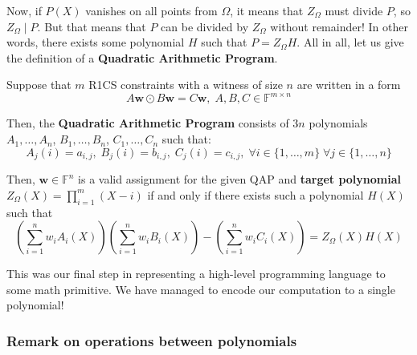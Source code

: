 \documentclass[../lecture-notes.tex]{subfiles}
\begin{document}
Now, if $P(X)$ vanishes on all points from $\Omega$, it means that $Z_{\Omega}$ must divide $P$, so $Z_{\Omega} \mid P$. But that means
that $P$ can be divided by $Z_{\Omega}$ without remainder! In other words, there exists some polynomial $H$ such that $P=Z_{\Omega}H$. All in all,
let us give the definition of a \textbf{Quadratic Arithmetic Program}.

\begin{definition}
    Suppose that $m$ R1CS constraints with a witness of size $n$ are written in a form
    \begin{equation*}
        A\mathbf{w} \odot B\mathbf{w} = C\mathbf{w}, \; A,B,C \in \mathbb{F}^{m \times n}
    \end{equation*}

    Then, the \textbf{Quadratic Arithmetic Program} consists of $3n$ polynomials $A_1,\dots,A_n$, $B_1,\dots,B_n$, $C_1,\dots,C_n$ such that:
    \begin{equation*}
        A_j(i) = a_{i,j}, \; B_j(i) = b_{i,j}, \; C_j(i) = c_{i,j}, \; \forall i \in \{1,\dots,m\} \; \forall j \in \{1,\dots,n\}
    \end{equation*}

    Then, $\mathbf{w} \in \mathbb{F}^n$ is a valid assignment for the given QAP and \textbf{target polynomial} $Z_{\Omega}(X) = \prod_{i=1}^m (X-i)$ if and only if there exists such a polynomial $H(X)$ such that
    \begin{equation*}
        \left( \sum_{i = 1}^{n} w_iA_i(X) \right)\left( \sum_{i = 1}^{n} w_iB_i(X) \right) - \left( \sum_{i = 1}^{n} w_iC_i(X) \right) = Z_{\Omega}(X)H(X)
    \end{equation*}
\end{definition}

This was our final step in representing a high-level programming language to some math primitive.
We have managed to encode our computation to a single polynomial!

\subsubsection*{Remark on operations between polynomials}
\end{document}
